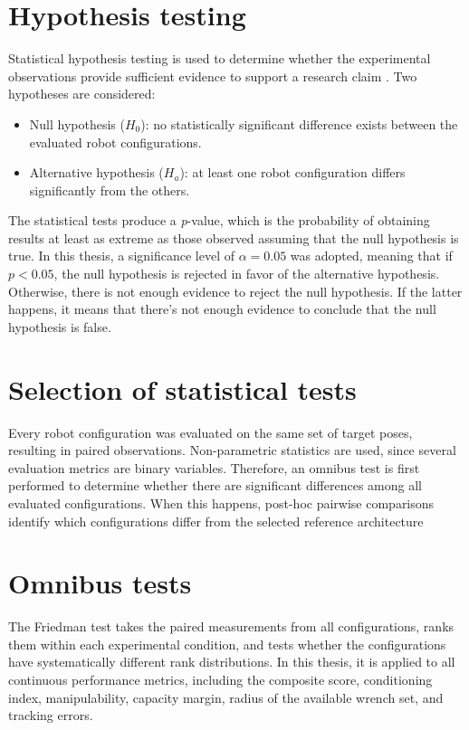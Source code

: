 \section{Hypothesis testing}

Statistical hypothesis testing is used to determine whether the experimental observations provide sufficient evidence to support a research claim \cite{statistic_lecture}. Two hypotheses are considered:

\begin{itemize}

\item Null hypothesis ($H_0$): no statistically significant difference exists between the evaluated robot configurations.

\item Alternative hypothesis ($H_a$): at least one robot configuration differs significantly from the others.

\end{itemize}

The statistical tests produce a \emph{p}-value, which is the probability of obtaining results at least as extreme as those observed assuming that the null hypothesis is true. In this thesis, a significance level of $\alpha = 0.05$ was adopted, meaning that if $p < 0.05$, the null hypothesis is rejected in favor of the alternative hypothesis. Otherwise, there is not enough evidence to reject the null hypothesis. If the latter happens, it means that there's not enough evidence to conclude that the null hypothesis is false.

\section{Selection of statistical tests}

Every robot configuration was evaluated on the same set of target poses, resulting in paired observations. Non-parametric statistics are used, since several evaluation metrics are binary variables. Therefore, an omnibus test is first performed to determine whether there are significant differences among all evaluated configurations. When this happens, post-hoc pairwise comparisons identify which configurations differ from the selected reference architecture

\section{Omnibus tests}
The Friedman test takes the paired measurements from all configurations, ranks them within each experimental condition, and tests whether the configurations have systematically different rank distributions. In this thesis, it is applied to all continuous performance metrics, including the composite score, conditioning index, manipulability, capacity margin, radius of the available wrench set, and tracking errors.

